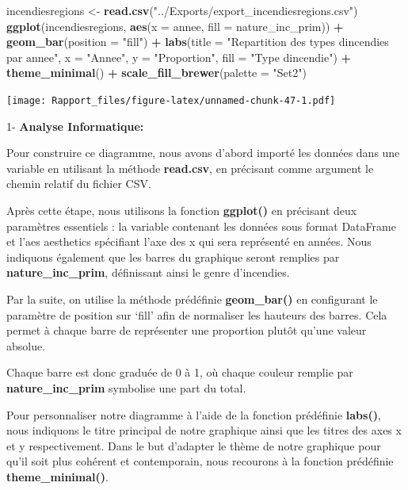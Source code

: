 \documentclass[
]{article}
\newenvironment{Shaded}{\begin{snugshade}}{\end{snugshade}}
\newcommand{\AttributeTok}[1]{\textcolor[rgb]{0.13,0.29,0.53}{#1}}
\newcommand{\FunctionTok}[1]{\textcolor[rgb]{0.13,0.29,0.53}{\textbf{#1}}}
\newcommand{\NormalTok}[1]{#1}
\newcommand{\OtherTok}[1]{\textcolor[rgb]{0.56,0.35,0.01}{#1}}
\newcommand{\SpecialCharTok}[1]{\textcolor[rgb]{0.81,0.36,0.00}{\textbf{#1}}}
\newcommand{\StringTok}[1]{\textcolor[rgb]{0.31,0.60,0.02}{#1}}
\begin{document}
\begin{Shaded}
\begin{Highlighting}[]
\NormalTok{incendiesregions }\OtherTok{\textless{}{-}} \FunctionTok{read.csv}\NormalTok{(}\StringTok{"../Exports/export\_incendiesregions.csv"}\NormalTok{)}
\FunctionTok{ggplot}\NormalTok{(incendiesregions, }\FunctionTok{aes}\NormalTok{(}\AttributeTok{x =}\NormalTok{ annee, }\AttributeTok{fill =}\NormalTok{ nature\_inc\_prim)) }\SpecialCharTok{+}
  \FunctionTok{geom\_bar}\NormalTok{(}\AttributeTok{position =} \StringTok{"fill"}\NormalTok{) }\SpecialCharTok{+}  
  \FunctionTok{labs}\NormalTok{(}\AttributeTok{title =} \StringTok{"Repartition des types d\textquotesingle{}incendies par annee"}\NormalTok{,}
       \AttributeTok{x =} \StringTok{"Annee"}\NormalTok{,}
       \AttributeTok{y =} \StringTok{"Proportion"}\NormalTok{,}
       \AttributeTok{fill =} \StringTok{"Type d\textquotesingle{}incendie"}\NormalTok{) }\SpecialCharTok{+}
  \FunctionTok{theme\_minimal}\NormalTok{() }\SpecialCharTok{+}  
  \FunctionTok{scale\_fill\_brewer}\NormalTok{(}\AttributeTok{palette =} \StringTok{"Set2"}\NormalTok{)}
\end{Highlighting}
\end{Shaded}

\texttt{[image: Rapport\_files/figure-latex/unnamed-chunk-47-1.pdf]}

1- \textbf{Analyse Informatique:}

Pour construire ce diagramme, nous avons d'abord importé les données
dans une variable en utilisant la méthode \textbf{read.csv}, en
précisant comme argument le chemin relatif du fichier CSV.

Après cette étape, nous utilisons la fonction \textbf{ggplot()} en
précisant deux paramètres essentiels : la variable contenant les données
sous format DataFrame et l'aes aesthetics spécifiant l'axe des x qui
sera représenté en années. Nous indiquons également que les barres du
graphique seront remplies par \textbf{nature\_inc\_prim}, définissant
ainsi le genre d'incendies.

Par la suite, on utilise la méthode prédéfinie \textbf{geom\_bar()} en
configurant le paramètre de position sur `fill' afin de normaliser les
hauteurs des barres. Cela permet à chaque barre de représenter une
proportion plutôt qu'une valeur absolue.

Chaque barre est donc graduée de 0 à 1, où chaque couleur remplie par
\textbf{nature\_inc\_prim} symbolise une part du total.

Pour personnaliser notre diagramme à l'aide de la fonction prédéfinie
\textbf{labs()}, nous indiquons le titre principal de notre graphique
ainsi que les titres des axes x et y respectivement. Dans le but
d'adapter le thème de notre graphique pour qu'il soit plus cohérent et
contemporain, nous recourons à la fonction prédéfinie
\textbf{theme\_minimal()}.
\end{document}
